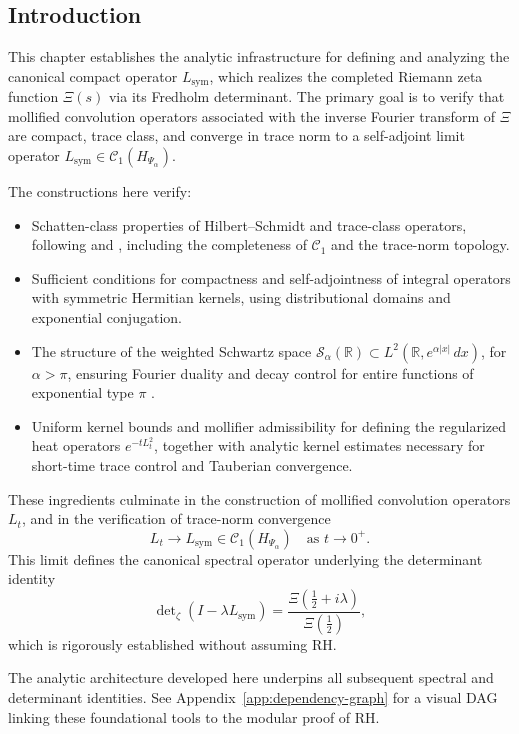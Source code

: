 \subsection*{Introduction}

This chapter establishes the analytic infrastructure for defining and analyzing the canonical compact operator \( L_{\mathrm{sym}} \), which realizes the completed Riemann zeta function \( \Xi(s) \) via its Fredholm determinant. The primary goal is to verify that mollified convolution operators associated with the inverse Fourier transform of \( \Xi \) are compact, trace class, and converge in trace norm to a self-adjoint limit operator \( L_{\mathrm{sym}} \in \mathcal{C}_1(H_{\Psi_\alpha}) \).

The constructions here verify:

\begin{itemize}
    \item Schatten-class properties of Hilbert–Schmidt and trace-class operators, following \cite[Ch.~4]{Simon2005TraceIdeals} and \cite[Ch.~VI]{ReedSimon1980I}, including the completeness of \( \mathcal{C}_1 \) and the trace-norm topology.
    
    \item Sufficient conditions for compactness and self-adjointness of integral operators with symmetric Hermitian kernels, using distributional domains and exponential conjugation.
    
    \item The structure of the weighted Schwartz space \( \mathcal{S}_\alpha(\mathbb{R}) \subset L^2(\mathbb{R}, e^{\alpha |x|}\, dx) \), for \( \alpha > \pi \), ensuring Fourier duality and decay control for entire functions of exponential type \( \pi \) \cite{Levin1996EntireLectures}.
    
    \item Uniform kernel bounds and mollifier admissibility for defining the regularized heat operators \( e^{-t L_t^2} \), together with analytic kernel estimates necessary for short-time trace control and Tauberian convergence.
\end{itemize}

These ingredients culminate in the construction of mollified convolution operators \( L_t \), and in the verification of trace-norm convergence
\[
L_t \to L_{\mathrm{sym}} \in \mathcal{C}_1(H_{\Psi_\alpha}) \quad \text{as } t \to 0^+.
\]
This limit defines the canonical spectral operator underlying the determinant identity
\[
\det\nolimits_{\zeta}(I - \lambda L_{\mathrm{sym}}) = \frac{\Xi\left(\tfrac{1}{2} + i\lambda\right)}{\Xi\left(\tfrac{1}{2}\right)},
\]
which is rigorously established without assuming RH.

\medskip

The analytic architecture developed here underpins all subsequent spectral and determinant identities.
See Appendix~\ref{app:dependency-graph} for a visual DAG linking these foundational tools to the modular proof of RH.
